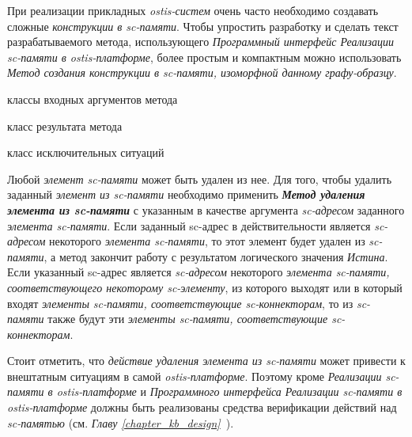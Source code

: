 При реализации прикладных \textit{ostis-систем} очень часто необходимо создавать сложные \textit{конструкции в sc-памяти}. Чтобы упростить разработку и сделать текст разрабатываемого метода, использующего \textit{Программный интерфейс Реализации sc-памяти в ostis-платформе}, более простым и компактным можно использовать \textit{Метод создания конструкции в sc-памяти, изоморфной данному графу-образцу}.

\begin{SCn}
\begin{scnindent}
\end{scnindent}
\begin{scnrelfromvector}{классы входных аргументов метода}
\end{scnrelfromvector}
\begin{scnrelfromlist}{класс результата метода}
\end{scnrelfromlist}
\begin{scnrelfromlist}{класс исключительных ситуаций}
\end{scnrelfromlist}
\end{SCn}

Любой \textit{элемент sc-памяти} может быть удален из нее. Для того, чтобы удалить заданный \textit{элемент из sc-памяти} необходимо применить \textbf{\textit{Метод удаления элемента из sc-памяти}} с указанным в качестве аргумента \textit{sc-адресом} заданного \textit{элемента sc-памяти}. Если заданный sc-адрес в действительности является \textit{sc-адресом} некоторого \textit{элемента sc-памяти}, то этот элемент будет удален из \textit{sc-памяти}, а метод закончит работу с результатом логического значения \textit{Истина}. Если указанный sc-адрес является \textit{sc-адресом} некоторого \textit{элемента sc-памяти, соответствующего некоторому sc-элементу}, из которого выходят или в который входят \textit{элементы sc-памяти, соответствующие sc-коннекторам}, то из \textit{sc-памяти} также будут эти \textit{элементы sc-памяти, соответствующие sc-коннекторам}.

Стоит отметить, что \textit{действие удаления элемента из sc-памяти} может привести к внештатным ситуациям в самой \textit{ostis-платформе}. Поэтому кроме \textit{Реализации sc-памяти в ostis-платформе} и \textit{Программного интерфейса Реализации sc-памяти в ostis-платформе} должны быть реализованы средства верификации действий над \textit{sc-памятью} (см. \textit{Главу \ref{chapter_kb_design}~}).

